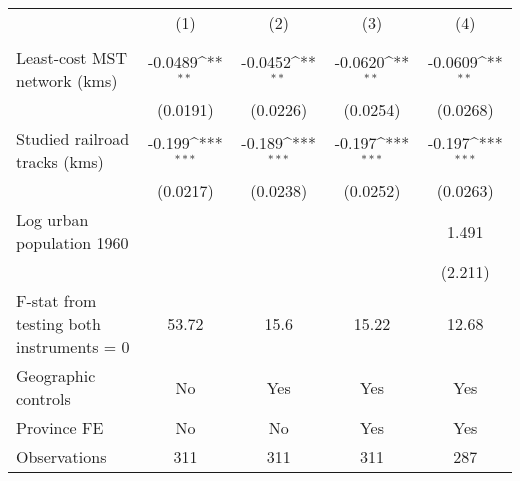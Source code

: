 {
\def\sym#1{\ifmmode^{#1}\else\(^{#1}\)\fi}
\begin{tabular}{l*{4}{c}}
\hline\hline
                &\multicolumn{1}{c}{(1)}&\multicolumn{1}{c}{(2)}&\multicolumn{1}{c}{(3)}&\multicolumn{1}{c}{(4)}\\
                &\multicolumn{1}{c}{}&\multicolumn{1}{c}{}&\multicolumn{1}{c}{}&\multicolumn{1}{c}{}\\
\hline
Least-cost MST network (kms)&  -0.0489\sym{**} &  -0.0452\sym{**} &  -0.0620\sym{**} &  -0.0609\sym{**} \\
                & (0.0191)         & (0.0226)         & (0.0254)         & (0.0268)         \\
[1em]
Studied railroad tracks (kms)&   -0.199\sym{***}&   -0.189\sym{***}&   -0.197\sym{***}&   -0.197\sym{***}\\
                & (0.0217)         & (0.0238)         & (0.0252)         & (0.0263)         \\
[1em]
Log urban population 1960&                  &                  &                  &    1.491         \\
                &                  &                  &                  &  (2.211)         \\
\hline
F-stat from testing both instruments = 0&    53.72         &     15.6         &    15.22         &    12.68         \\
Geographic controls&       No         &      Yes         &      Yes         &      Yes         \\
Province FE     &       No         &       No         &      Yes         &      Yes         \\
Observations    &      311         &      311         &      311         &      287         \\
\hline\hline
\end{tabular}
}
